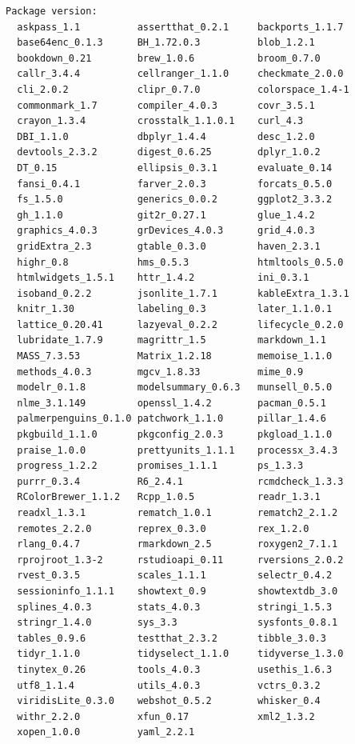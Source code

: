 \documentclass[
  11pt,
]{scrartcl}
\begin{document}
\begin{verbatim}
Package version:
  askpass_1.1          assertthat_0.2.1     backports_1.1.7     
  base64enc_0.1.3      BH_1.72.0.3          blob_1.2.1          
  bookdown_0.21        brew_1.0.6           broom_0.7.0         
  callr_3.4.4          cellranger_1.1.0     checkmate_2.0.0     
  cli_2.0.2            clipr_0.7.0          colorspace_1.4-1    
  commonmark_1.7       compiler_4.0.3       covr_3.5.1          
  crayon_1.3.4         crosstalk_1.1.0.1    curl_4.3            
  DBI_1.1.0            dbplyr_1.4.4         desc_1.2.0          
  devtools_2.3.2       digest_0.6.25        dplyr_1.0.2         
  DT_0.15              ellipsis_0.3.1       evaluate_0.14       
  fansi_0.4.1          farver_2.0.3         forcats_0.5.0       
  fs_1.5.0             generics_0.0.2       ggplot2_3.3.2       
  gh_1.1.0             git2r_0.27.1         glue_1.4.2          
  graphics_4.0.3       grDevices_4.0.3      grid_4.0.3          
  gridExtra_2.3        gtable_0.3.0         haven_2.3.1         
  highr_0.8            hms_0.5.3            htmltools_0.5.0     
  htmlwidgets_1.5.1    httr_1.4.2           ini_0.3.1           
  isoband_0.2.2        jsonlite_1.7.1       kableExtra_1.3.1    
  knitr_1.30           labeling_0.3         later_1.1.0.1       
  lattice_0.20.41      lazyeval_0.2.2       lifecycle_0.2.0     
  lubridate_1.7.9      magrittr_1.5         markdown_1.1        
  MASS_7.3.53          Matrix_1.2.18        memoise_1.1.0       
  methods_4.0.3        mgcv_1.8.33          mime_0.9            
  modelr_0.1.8         modelsummary_0.6.3   munsell_0.5.0       
  nlme_3.1.149         openssl_1.4.2        pacman_0.5.1        
  palmerpenguins_0.1.0 patchwork_1.1.0      pillar_1.4.6        
  pkgbuild_1.1.0       pkgconfig_2.0.3      pkgload_1.1.0       
  praise_1.0.0         prettyunits_1.1.1    processx_3.4.3      
  progress_1.2.2       promises_1.1.1       ps_1.3.3            
  purrr_0.3.4          R6_2.4.1             rcmdcheck_1.3.3     
  RColorBrewer_1.1.2   Rcpp_1.0.5           readr_1.3.1         
  readxl_1.3.1         rematch_1.0.1        rematch2_2.1.2      
  remotes_2.2.0        reprex_0.3.0         rex_1.2.0           
  rlang_0.4.7          rmarkdown_2.5        roxygen2_7.1.1      
  rprojroot_1.3-2      rstudioapi_0.11      rversions_2.0.2     
  rvest_0.3.5          scales_1.1.1         selectr_0.4.2       
  sessioninfo_1.1.1    showtext_0.9         showtextdb_3.0      
  splines_4.0.3        stats_4.0.3          stringi_1.5.3       
  stringr_1.4.0        sys_3.3              sysfonts_0.8.1      
  tables_0.9.6         testthat_2.3.2       tibble_3.0.3        
  tidyr_1.1.0          tidyselect_1.1.0     tidyverse_1.3.0     
  tinytex_0.26         tools_4.0.3          usethis_1.6.3       
  utf8_1.1.4           utils_4.0.3          vctrs_0.3.2         
  viridisLite_0.3.0    webshot_0.5.2        whisker_0.4         
  withr_2.2.0          xfun_0.17            xml2_1.3.2          
  xopen_1.0.0          yaml_2.2.1          
\end{verbatim}
\end{document}
